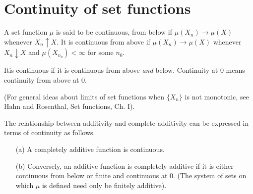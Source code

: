 \section{Continuity of set functions}\label{chap1:sec5}

\begin{defi*}
A set function $\mu$ is said to be
  continuous, from below if $\mu(X_n)\rightarrow \mu (X)$ whenever
  $X_n \uparrow X$. It is continuous from above if
  $\mu(X_n)\rightarrow \mu(X)$ whenever $X_n \downarrow X$ and $\mu
  (X_{n_o}) < \infty$ for some $n_0$. 
\end{defi*}

It\pageoriginale is continuous if it is continuous from above {\em
  and} below. Continuity at 0 means continuity from above at 0.  

(For general ideas about limits of 
set functions when $\{X_n\}$ is not monotonic, see Hahn and
Rosenthal, Set functions, Ch. I).  

The relationship between additivity and
complete additivity can be expressed in terms of continuity as follows.

\begin{theorem}\label{chap1:sec5:thm2} %
\begin{itemize}
\item[\rm(a)] A completely additive function is continuous.
  
\item[\rm(b)] Conversely, an additive function is completely additive if it is
  either continuous from below or finite and continuous at 0. 
  (The system of sets on which $\mu$ is defined need only be finitely additive).
\end{itemize}
\end{theorem}

